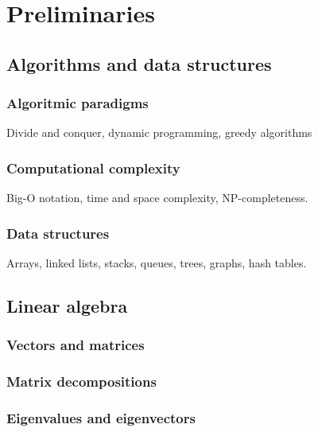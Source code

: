 \chapter{Preliminaries}
\label{chap:preliminaries}


\section{Algorithms and data structures}

\subsection{Algoritmic paradigms}

Divide and conquer, dynamic programming, greedy algorithms

\subsection{Computational complexity}

Big-O notation, time and space complexity, NP-completeness.

\subsection{Data structures}

Arrays, linked lists, stacks, queues, trees, graphs, hash tables.

\section{Linear algebra}

\subsection{Vectors and matrices}

\subsection{Matrix decompositions}

\subsection{Eigenvalues and eigenvectors}

